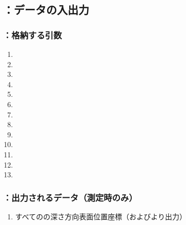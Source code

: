\subsection{\DLone：データの入出力}

\subsubsection{\DLone：格納する引数}
\begin{enumerate}[label*=\sarrow]
\item \PMAlocationAngle
\item \PMDimpleAngle
\item \PMDimpleHorizontalPitch
\item \PMDimpleVerticalPitch
\item \PMDimpleOddRowLength
\item \PMDimpleEvenRowLength
\item \PMDimpleRowNum
\item \PMDistanceTopEndFaceDimpleFirstRow
\item \PMDimpleDepth
\item \PMPlatingThk
\item \PMCenterCurvatureRadius
\item \PMTopAlocationLength
\item \PMTopReAlocationLength
\end{enumerate}

\subsubsection{\DLone：出力されるデータ（測定時のみ）}
\begin{enumerate}[label*=\sarrow]
\item すべての\Dimple の深さ方向表面位置座標（\DMLthreeAC および\DMLthreeBD より出力）
\end{enumerate}


